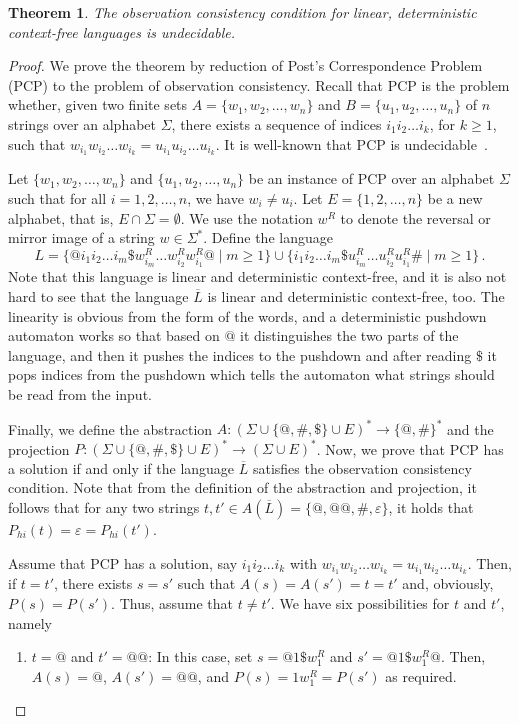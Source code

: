 \documentclass[preprint,1p,times]{elsarticle}
\newcommand{\eps}{\varepsilon}
\newtheorem{theorem}{Theorem}
\begin{document}
  \begin{theorem}
    The observation consistency condition for linear, deterministic context-free languages is undecidable.
  \end{theorem}
  \begin{proof}
    We prove the theorem by reduction of Post's Correspondence Problem (PCP) to the problem of observation consistency. Recall that PCP is the problem whether, given two finite sets $A=\{w_1,w_2,\ldots,w_n\}$ and $B=\{u_1,u_2,\ldots,u_n\}$ of $n$ strings over an alphabet $\Sigma$, there exists a sequence of indices $i_1 i_2 \ldots i_k$, for $k\ge 1$, such that $w_{i_1} w_{i_2} \ldots w_{i_k} = u_{i_1} u_{i_2} \ldots u_{i_k}$. It is well-known that PCP is undecidable~\cite{post}.
    
    Let $\{w_1,w_2,\ldots,w_n\}$ and $\{u_1,u_2,\ldots,u_n\}$ be an instance of PCP over an alphabet $\Sigma$ such that for all $i=1,2,\ldots, n$, we have $w_i\neq u_i$. Let $E=\{1,2,\ldots,n\}$ be a new alphabet, that is, $E\cap\Sigma=\emptyset$. We use the notation $w^R$ to denote the reversal or mirror image of a string $w\in\Sigma^*$. Define the language 
    \[
      L=\{@i_1i_2\ldots i_m\$w_{i_m}^R\ldots w_{i_2}^Rw_{i_1}^R@ \mid m\ge 1\}\cup
         \{i_1i_2\ldots i_m\$u_{i_m}^R\ldots u_{i_2}^Ru_{i_1}^R\# \mid m\ge 1\}\,.
    \]
    Note that this language is linear and deterministic context-free, and it is also not hard to see that the language $\overline{L}$ is linear and deterministic context-free, too. The linearity is obvious from the form of the words, and a deterministic pushdown automaton works so that based on $@$ it distinguishes the two parts of the language, and then it pushes the indices to the pushdown and after reading $\$$ it pops indices from the pushdown which tells the automaton what strings should be read from the input. 
    
    Finally, we define the abstraction $A:(\Sigma\cup\{@,\#,\$\}\cup E)^*\to \{@,\#\}^*$ and the projection $P:(\Sigma\cup\{@,\#,\$\}\cup E)^*\to (\Sigma\cup E)^*$. Now, we prove that PCP has a solution if and only if the language $\overline{L}$ satisfies the observation consistency condition. Note that from the definition of the abstraction and projection, it follows that for any two strings $t,t'\in A(\overline{L})=\{@,@@,\#,\eps\}$, it holds that $P_{hi}(t)=\eps=P_{hi}(t')$.
    
    Assume that PCP has a solution, say $i_1i_2\ldots i_k$ with $w_{i_1}w_{i_2}\ldots w_{i_k}=u_{i_1}u_{i_2}\ldots u_{i_k}$. Then, if $t=t'$, there exists $s=s'$ such that $A(s)=A(s')=t=t'$ and, obviously, $P(s)=P(s')$. Thus, assume that $t\neq t'$. We have six possibilities for $t$ and $t'$, namely
    \begin{enumerate}
      \item $t=@$ and $t'=@@$: In this case, set $s=@1\$w_1^R$ and $s'=@1\$w_1^R@$. Then, $A(s)=@$, $A(s')=@@$, and $P(s)=1w_1^R=P(s')$ as required.
      

\end{enumerate}
\end{proof}
\end{document}

